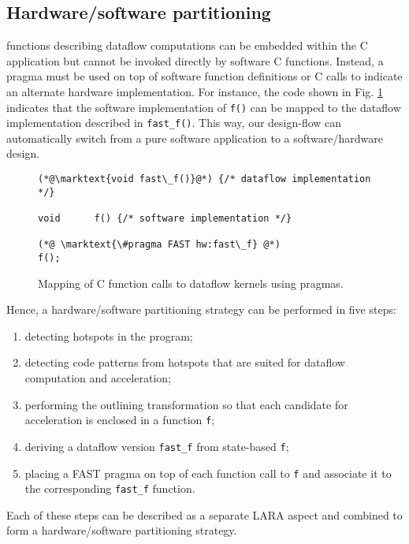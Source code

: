 \subsection{Hardware/software partitioning}
\label{sect:asp_hsp}
\FAST{} functions describing dataflow computations can be embedded
within the C application but cannot be invoked directly by software C
functions.  Instead, a \FAST{} pragma must be used on top of software
function definitions or C calls to indicate an alternate hardware
implementation. For instance, the code shown in
Fig. \ref{fig:aspect-switch} indicates that the software
implementation of \texttt{f()} can be mapped to the dataflow
implementation described in \texttt{fast\_f()}. This way, our
design-flow can automatically switch from a pure software application
to a software/hardware design.

\lstset{style=MaxC}
\begin{figure}[!h]
\begin{lstlisting}
(*@\marktext{void fast\_f()}@*) {/* dataflow implementation */}

void      f() {/* software implementation */}

(*@ \marktext{\#pragma FAST hw:fast\_f} @*)
f();
\end{lstlisting}
\caption{Mapping of C function calls to dataflow kernels using \FAST{} pragmas.}
\label{fig:aspect-switch}
\end{figure}


\noindent

Hence, a hardware/software partitioning strategy can be performed in
five steps:
\begin{enumerate}
  \item detecting hotspots in the program;
  \item detecting code patterns from hotspots that are suited for
    dataflow computation and acceleration;
  \item performing the outlining transformation so that each
    candidate for acceleration is enclosed in a function \texttt{f};
  \item deriving a dataflow version \texttt{fast\_f} from state-based
    \texttt{f};
  \item placing a FAST pragma on top of each function call to
    \texttt{f} and associate it to the corresponding \texttt{fast\_f}
    function.
\end{enumerate}

Each of these steps can be described as a separate LARA aspect and
combined to form a hardware/software partitioning strategy.




